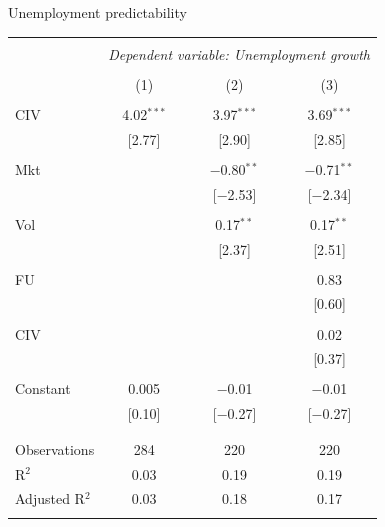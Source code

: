 \documentclass{beamer}
\begin{document}
\scriptsize
\renewcommand{\arraystretch}{0.88}
\begin{frame}{Unemployment predictability}
\begin{table}[!htbp] \centering 
  \label{} 
\begin{tabular}{@{\extracolsep{5pt}}lccc} 
\\[-1.8ex]\hline 
\hline \\[-1.8ex] 
 & \multicolumn{3}{c}{\textit{Dependent variable: Unemployment growth}} \\ 
\cline{2-4} 
\\[-1.8ex] & (1) & (2) & (3)\\ 
\hline \\[-1.8ex] 
 CIV & 4.02$^{***}$ & 3.97$^{***}$ & 3.69$^{***}$ \\ 
  & [2.77] & [2.90] & [2.85] \\ 
  & & & \\ 
 Mkt &  & $-$0.80$^{**}$ & $-$0.71$^{**}$ \\ 
  &  & [$-$2.53] & [$-$2.34] \\ 
  & & & \\ 
 Vol &  & 0.17$^{**}$ & 0.17$^{**}$ \\ 
  &  & [2.37] & [2.51] \\ 
  & & & \\ 
 FU &  &  & 0.83 \\ 
  &  &  & [0.60] \\ 
  & & & \\ 
 CIV &  &  & 0.02 \\ 
  &  &  & [0.37] \\ 
  & & & \\ 
 Constant & 0.005 & $-$0.01 & $-$0.01 \\ 
  & [0.10] & [$-$0.27] & [$-$0.27] \\ 
  & & & \\ 
\hline \\[-1.8ex] 
Observations & 284 & 220 & 220 \\ 
R$^{2}$ & 0.03 & 0.19 & 0.19 \\ 
Adjusted R$^{2}$ & 0.03 & 0.18 & 0.17 \\ 
\hline 
\hline \\[-1.8ex] 
\end{tabular} 
\end{table} 
\end{frame}
\end{document}
